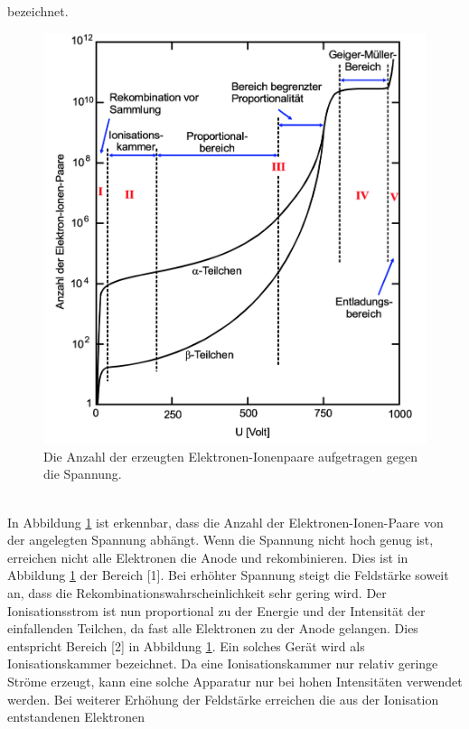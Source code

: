     bezeichnet.
    \begin{figure}
      \centering
        \label{fig:aufbau2}
        \includegraphics[scale=0.3]{content/SpannungAnzahlElektronenGMZ.png}
        \caption{Die Anzahl der erzeugten Elektronen-Ionenpaare aufgetragen gegen die Spannung.}
    \end{figure}
    \\
    In Abbildung \ref{fig:aufbau2} ist erkennbar, dass die Anzahl der Elektronen-Ionen-Paare von der
    angelegten Spannung abhängt. Wenn die Spannung nicht hoch genug ist, erreichen nicht alle
    Elektronen die Anode und rekombinieren. Dies ist in Abbildung \ref{fig:aufbau2} der Bereich [1].
    Bei erhöhter Spannung steigt die Feldstärke soweit an, dass die Rekombinationswahrscheinlichkeit
    sehr gering wird. Der Ionisationsstrom ist nun proportional zu der Energie und der Intensität der
    einfallenden Teilchen, da fast alle Elektronen zu der Anode gelangen. Dies entspricht Bereich [2]
    in Abbildung \ref{fig:aufbau2}. Ein solches Gerät wird als Ionisationskammer bezeichnet.
    Da eine Ionisationskammer nur relativ geringe Ströme erzeugt, kann eine solche Apparatur nur bei
    hohen Intensitäten verwendet werden.
    Bei weiterer Erhöhung der Feldstärke erreichen die aus der Ionisation entstandenen Elektronen
